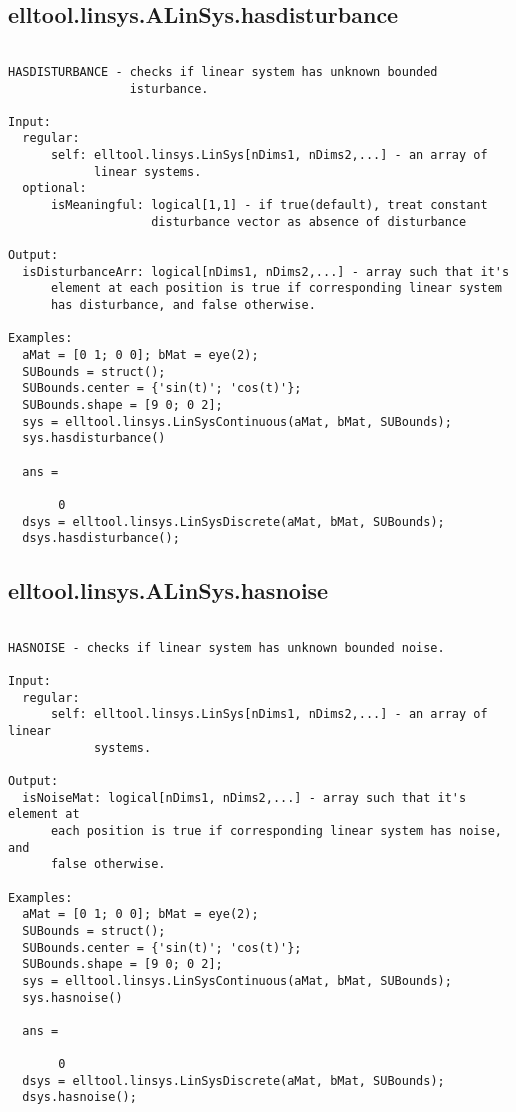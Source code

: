 \subsection{\texorpdfstring{elltool.linsys.ALinSys.hasdisturbance}{hasdisturbance}}\label{method:elltool.linsys.ALinSys.hasdisturbance}
\begin{verbatim}

HASDISTURBANCE - checks if linear system has unknown bounded
                 isturbance.

Input:
  regular:
      self: elltool.linsys.LinSys[nDims1, nDims2,...] - an array of
            linear systems.
  optional:
      isMeaningful: logical[1,1] - if true(default), treat constant
                    disturbance vector as absence of disturbance

Output:
  isDisturbanceArr: logical[nDims1, nDims2,...] - array such that it's
      element at each position is true if corresponding linear system
      has disturbance, and false otherwise.

Examples:
  aMat = [0 1; 0 0]; bMat = eye(2);
  SUBounds = struct();
  SUBounds.center = {'sin(t)'; 'cos(t)'};
  SUBounds.shape = [9 0; 0 2];
  sys = elltool.linsys.LinSysContinuous(aMat, bMat, SUBounds);
  sys.hasdisturbance()

  ans =

       0
  dsys = elltool.linsys.LinSysDiscrete(aMat, bMat, SUBounds);
  dsys.hasdisturbance();
\end{verbatim}
\subsection{\texorpdfstring{elltool.linsys.ALinSys.hasnoise}{hasnoise}}\label{method:elltool.linsys.ALinSys.hasnoise}
\begin{verbatim}

HASNOISE - checks if linear system has unknown bounded noise.

Input:
  regular:
      self: elltool.linsys.LinSys[nDims1, nDims2,...] - an array of linear
            systems.

Output:
  isNoiseMat: logical[nDims1, nDims2,...] - array such that it's element at
      each position is true if corresponding linear system has noise, and
      false otherwise.

Examples:
  aMat = [0 1; 0 0]; bMat = eye(2);
  SUBounds = struct();
  SUBounds.center = {'sin(t)'; 'cos(t)'};
  SUBounds.shape = [9 0; 0 2];
  sys = elltool.linsys.LinSysContinuous(aMat, bMat, SUBounds);
  sys.hasnoise()

  ans =

       0
  dsys = elltool.linsys.LinSysDiscrete(aMat, bMat, SUBounds);
  dsys.hasnoise();
\end{verbatim}

